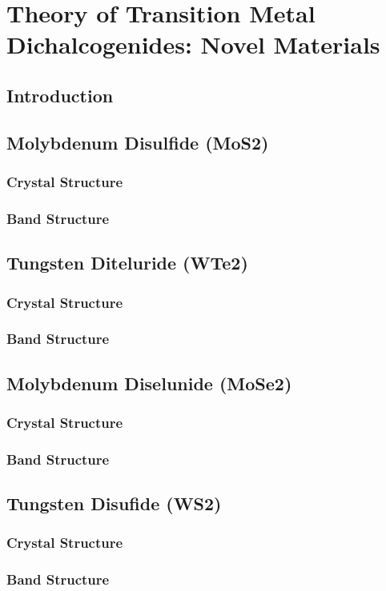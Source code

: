 \documentclass[microe]{ritthesis}
\begin{document}
\chapter{Theory of Transition Metal Dichalcogenides: Novel Materials}
\section{Introduction}
\section{Molybdenum Disulfide (MoS2)}
\subsection{Crystal Structure}
\subsection{Band Structure}
\section{Tungsten Diteluride (WTe2)}
\subsection{Crystal Structure}
\subsection{Band Structure}
\section{Molybdenum Diselunide (MoSe2)}
\subsection{Crystal Structure}
\subsection{Band Structure}
\section{Tungsten Disufide (WS2)}
\subsection{Crystal Structure}
\subsection{Band Structure}
\end{document}
